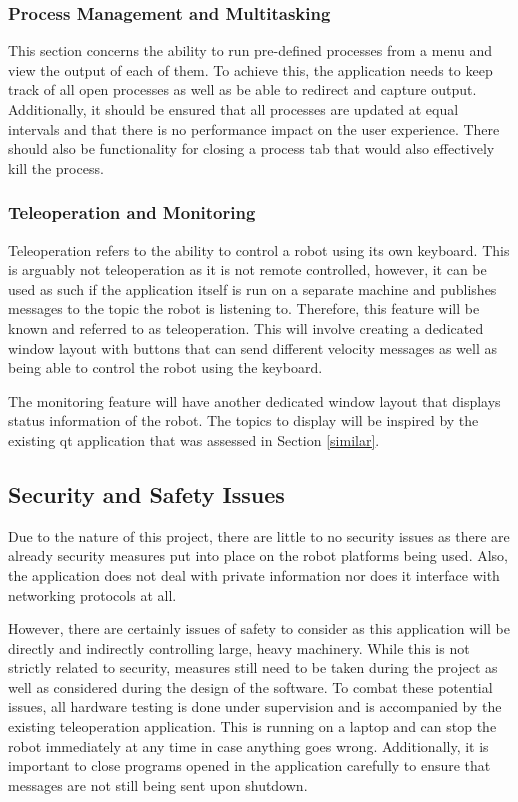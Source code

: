 \subsubsection{Process Management and Multitasking}

This section concerns the ability to run pre-defined processes from a menu and view the output of each of them. To achieve this, the application needs to keep track of all open processes as well as be able to redirect and capture output. Additionally, it should be ensured that all processes are updated at equal intervals and that there is no performance impact on the user experience. There should also be functionality for closing a process tab that would also effectively kill the process.

\subsubsection{Teleoperation and Monitoring}

Teleoperation refers to the ability to control a robot using its own keyboard. This is arguably not teleoperation as it is not remote controlled, however, it can be used as such if the application itself is run on a separate machine and publishes messages to the topic the robot is listening to. Therefore, this feature will be known and referred to as teleoperation. This will involve creating a dedicated window layout with buttons that can send different velocity messages as well as being able to control the robot using the keyboard.

The monitoring feature will have another dedicated window layout that displays status information of the robot. The topics to display will be inspired by the existing {\selectfont qt} application that was assessed in Section \ref{similar}.

\subsection{Security and Safety Issues}
\label{safety}

Due to the nature of this project, there are little to no security issues as there are already security measures put into place on the robot platforms being used. Also, the application does not deal with private information nor does it interface with networking protocols at all.

However, there are certainly issues of safety to consider as this application will be directly and indirectly controlling large, heavy machinery. While this is not strictly related to security, measures still need to be taken during the project as well as considered during the design of the software. To combat these potential issues, all hardware testing is done under supervision and is accompanied by the existing teleoperation application. This is running on a laptop and can stop the robot immediately at any time in case anything goes wrong. Additionally, it is important to close programs opened in the application carefully to ensure that messages are not still being sent upon shutdown.

